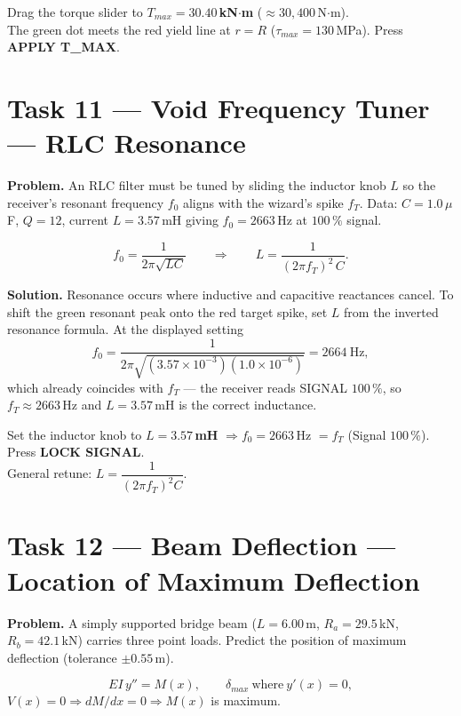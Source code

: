 \documentclass[11pt]{article}
\newcommand{\task}[2]{\section{Task #1 --- #2}}
\begin{document}
\begin{answer}
Drag the torque slider to \textbf{$T_{max} = 30.40$\,kN$\cdot$m}
($\approx30{,}400$\,N$\cdot$m).\\
The green dot meets the red yield line at $r=R$ ($\tau_{max}=130$\,MPa).
Press \textbf{APPLY T\_MAX}.
\end{answer}

\task{11}{Void Frequency Tuner --- RLC Resonance}
\textbf{Problem.} An RLC filter must be tuned by sliding the inductor knob $L$
so the receiver's resonant frequency $f_0$ aligns with the wizard's spike
$f_T$. Data: $C=1.0\,\mu$F, $Q=12$, current $L=3.57$\,mH giving
$f_0=2663$\,Hz at $100\,\%$ signal.

\begin{relbox}
\[
f_0=\frac{1}{2\pi\sqrt{LC}}\qquad\Longrightarrow\qquad
L=\frac{1}{(2\pi f_T)^{2}\,C}.
\]
\end{relbox}

\textbf{Solution.} Resonance occurs where inductive and capacitive reactances
cancel. To shift the green resonant peak onto the red target spike, set $L$
from the inverted resonance formula. At the displayed setting
\[
f_0=\frac{1}{2\pi\sqrt{(3.57\times10^{-3})(1.0\times10^{-6})}}=2664\ \text{Hz},
\]
which already coincides with $f_T$ --- the receiver reads SIGNAL $100\,\%$,
so $f_T\approx2663$\,Hz and $L=3.57$\,mH is the correct inductance.

\begin{answer}
Set the inductor knob to \textbf{$L = 3.57$\,mH} $\Rightarrow f_0=2663$\,Hz $=f_T$
(Signal $100\,\%$). Press \textbf{LOCK SIGNAL}.\\
General retune: $L=\dfrac{1}{(2\pi f_T)^2 C}$.
\end{answer}

\task{12}{Beam Deflection --- Location of Maximum Deflection}
\textbf{Problem.} A simply supported bridge beam ($L=6.00$\,m,
$R_a=29.5$\,kN, $R_b=42.1$\,kN) carries three point loads. Predict the
position of maximum deflection (tolerance $\pm0.55$\,m).

\begin{relbox}
\[
EI\,y''=M(x),\qquad
\delta_{max}\ \text{where}\ y'(x)=0,
\]
$V(x)=0\Rightarrow dM/dx=0\Rightarrow M(x)$ is maximum.
\end{relbox}
\end{document}
